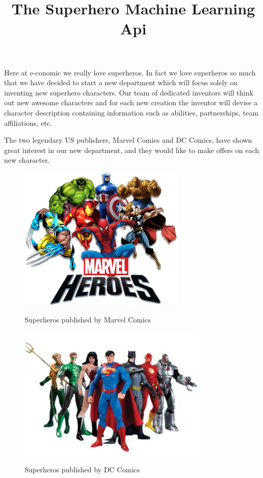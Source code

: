 \documentclass{article}
\title{The Superhero Machine Learning Api}
\date{}
\begin{document}
    \maketitle
    Here at e-conomic we really love superheros. In fact we love superheros
    so much that we have decided to start a new department which will focus
    solely on inventing new superhero characters. Our team of dedicated
    inventors will think out new awesome characters and for each new creation
    the inventor will devise a character description containing information
    such as abilities, partnerships, team affiliations, etc.

    The two legendary US publishers, Marvel Comics and DC Comics, have shown
    great interest in our new department, and they would like to make offers
    on each new character.

    \begin{figure}[h]
            \centering
            \includegraphics[width=0.7\textwidth]{marvel}
            \caption*{\scriptsize{Superheros published by Marvel Comics}}
        \endminipage\hfill
            \centering
            \includegraphics[width=0.8\textwidth]{dc}
            \caption*{\scriptsize{Superheros published by DC Comics}}
        \endminipage
    \end{figure}
\end{document}
